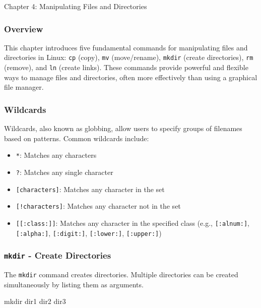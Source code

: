 \begin{notes}{Chapter 4: Manipulating Files and Directories}
    \subsubsection*{Overview}

    This chapter introduces five fundamental commands for manipulating files and directories in Linux: \texttt{cp} (copy), \texttt{mv} (move/rename), \texttt{mkdir} (create directories), \texttt{rm} (remove), 
    and \texttt{ln} (create links). These commands provide powerful and flexible ways to manage files and directories, often more effectively than using a graphical file manager.

    \subsubsection*{Wildcards}

    Wildcards, also known as globbing, allow users to specify groups of filenames based on patterns. Common wildcards include:
    \begin{itemize}
        \item \texttt{*}: Matches any characters
        \item \texttt{?}: Matches any single character
        \item \texttt{[characters]}: Matches any character in the set
        \item \texttt{[!characters]}: Matches any character not in the set
        \item \texttt{[[:class:]]}: Matches any character in the specified class (e.g., \texttt{[:alnum:]}, \texttt{[:alpha:]}, \texttt{[:digit:]}, \texttt{[:lower:]}, \texttt{[:upper:]})
    \end{itemize}

    \subsubsection*{\texttt{mkdir} - Create Directories}

    The \texttt{mkdir} command creates directories. Multiple directories can be created simultaneously by listing them as arguments.

    \begin{highlight}
    \begin{code}[Pseudo]
    mkdir dir1 dir2 dir3
    \end{code}
    \end{highlight}


\end{notes}
